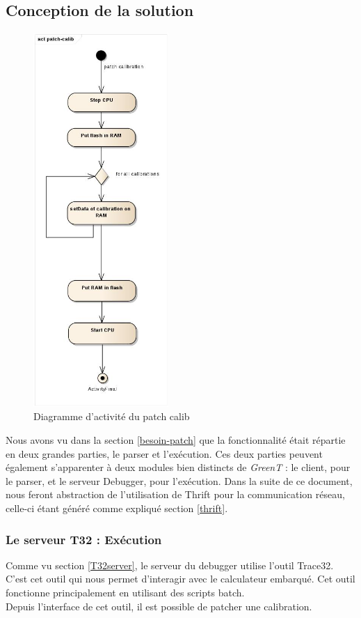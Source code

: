 \subsection{Conception de la solution}
		\begin{figure}
			\vspace{-20px}
			\includegraphics[height=14.2cm]{contents/images/script_activite.jpg}
			\caption{Diagramme d'activité du patch calib}
			\label{fig:scriptBatch} 
			\vspace{-3.5cm}
		\end{figure}
	Nous avons vu dans la section \ref{besoin-patch} que la fonctionnalité était répartie en deux grandes parties, le parser et l'exécution. Ces deux parties peuvent également s'apparenter à deux modules bien distincts de \textit{GreenT} : le client, pour le parser, et le serveur Debugger, pour l'exécution. Dans la suite de ce document, nous feront abstraction de l'utilisation de Thrift pour la communication réseau, celle-ci étant généré comme expliqué section \ref{thrift}.
	
	\subsubsection{Le serveur T32 : Exécution}
	Comme vu section \ref{T32server}, le serveur du debugger utilise l'outil Trace32. C'est cet outil qui nous permet d’interagir avec le calculateur embarqué. Cet outil fonctionne principalement en utilisant des scripts batch.\\
	Depuis l'interface de cet outil, il est possible de patcher une calibration.

